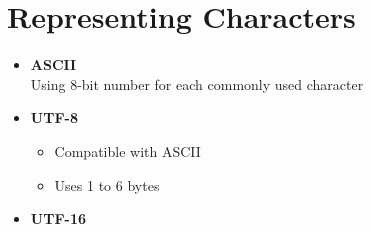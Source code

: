\documentclass[oneside]{book}
\begin{document}
\section{Representing Characters}
\begin{itemize}
	\item \textbf{ASCII}\\
	      Using 8-bit number for each commonly used character
	\item \textbf{UTF-8}
	      \begin{itemize}
		      \item Compatible with ASCII
		      \item Uses 1 to 6 bytes
	      \end{itemize}
	\item \textbf{UTF-16}
\end{itemize}



\end{document}
